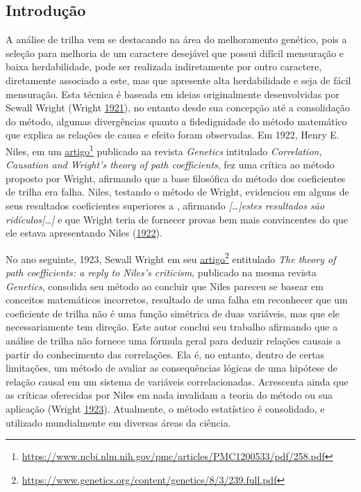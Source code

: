 \documentclass[
]{book}
\numberwithin{equation}{section}
\begin{document}
\hypertarget{introduuxe7uxe3o-1}{%
\subsection{Introdução}\label{introduuxe7uxe3o-1}}

A análise de trilha vem se destacando na área do melhoramento genético, pois a seleção para melhoria de um caractere desejável que possui difícil mensuração e baixa herdabilidade, pode ser realizada indiretamente por outro caractere, diretamente associado a este, mas que apresente alta herdabilidade e seja de fácil mensuração. Esta técnica é baseada em ideias originalmente desenvolvidas por Sewall Wright (Wright \protect\hyperlink{ref-Wright1921}{1921}), no entanto desde sua concepção até a consolidação do método, algumas divergências quanto a fidedignidade do método matemático que explica as relações de causa e efeito foram observadas. Em 1922, Henry E. Niles, em um \href{https://www.ncbi.nlm.nih.gov/pmc/articles/PMC1200533/pdf/258.pdf}{artigo}\footnote{\url{https://www.ncbi.nlm.nih.gov/pmc/articles/PMC1200533/pdf/258.pdf}} publicado na revista \emph{Genetics} intitulado \emph{Correlation, Causation and Wright's theory of path coefficients}, fez uma crítica ao método proposto por Wright, afirmando que a base filosófica do método dos coeficientes de trilha era falha. Niles, testando o método de Wright, evidenciou em alguns de seus resultados coeficientes superiores a \textbar, afirmando \emph{{[}\ldots{]}estes resultados são ridículos{[}\ldots{]}} e que Wright teria de fornecer provas bem mais convincentes do que ele estava apresentando Niles (\protect\hyperlink{ref-Niles1922}{1922}).

No ano seguinte, 1923, Sewall Wright em seu \href{https://www.genetics.org/content/genetics/8/3/239.full.pdf}{artigo}\footnote{\url{https://www.genetics.org/content/genetics/8/3/239.full.pdf}} entitulado \emph{The theory of path coefficients: a reply to Niles's criticism}, publicado na mesma revista \emph{Genetics}, consolida seu método ao concluir que Niles pareceu se basear em conceitos matemáticos incorretos, resultado de uma falha em reconhecer que um coeficiente de trilha não é uma função simétrica de duas variáveis, mas que ele necessariamente tem direção. Este autor conclui seu trabalho afirmando que a análise de trilha não fornece uma fórmula geral para deduzir relações causais a partir do conhecimento das correlações. Ela é, no entanto, dentro de certas limitações, um método de avaliar as consequências lógicas de uma hipótese de relação causal em um sistema de variáveis correlacionadas. Acrescenta ainda que as críticas oferecidas por Niles em nada invalidam a teoria do método ou sua aplicação (Wright \protect\hyperlink{ref-Wright1923}{1923}). Atualmente, o método estatístico é consolidado, e utilizado mundialmente em diversas áreas da ciência.
\end{document}
